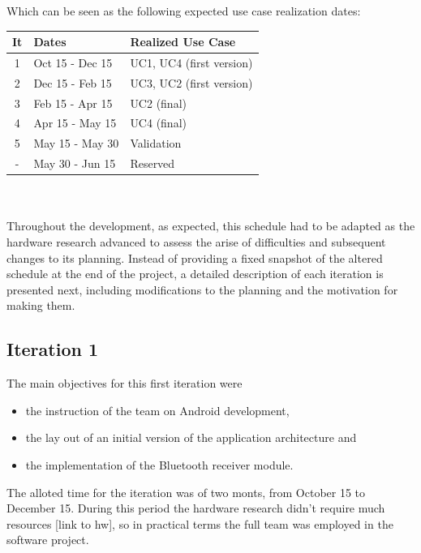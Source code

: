 			Which can be seen as the following expected use case realization dates:\\

			\begin{tabular}{| c | l | l |} %
				\hline
				It & Dates & Realized Use Case \\ \hline
				1 & Oct 15 - Dec 15 & UC1, UC4 (first version)\\ \hline
				2 & Dec 15 - Feb 15 & UC3, UC2 (first version)\\ \hline
				3 & Feb 15 - Apr 15 & UC2 (final) \\ \hline
				4 & Apr 15 - May 15 & UC4 (final) \\ \hline
				5 & May 15 - May 30 & Validation \\ \hline
				- & May 30 - Jun 15 & Reserved \\
				\hline
			\end{tabular}\\\\

			Throughout the development, as expected, this schedule had to be adapted as the hardware research advanced to assess the arise of difficulties and subsequent changes to its planning. Instead of providing a fixed snapshot of the altered schedule at the end of the project, a detailed description of each iteration is presented next, including modifications to the planning and the motivation for making them.

		\subsection{Iteration 1}

			The main objectives for this first iteration were
			\begin{itemize} 
				\item the instruction of the team on Android development, 
				\item the lay out of an initial version of the application architecture and
				\item the implementation of the Bluetooth receiver module.
			\end{itemize}

			The alloted time for the iteration was of two monts, from October 15 to December 15. During this period the hardware research didn't require much resources [link to hw], so in practical terms the full team was employed in the software project.\\

